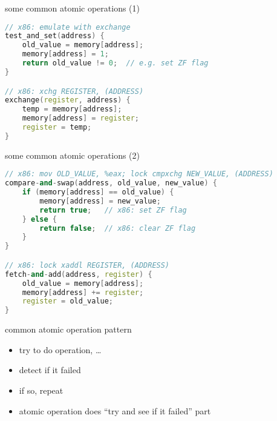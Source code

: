 
\begin{frame}[fragile,label=moreCommonAtomic1]{some common atomic operations (1)}
\begin{lstlisting}[language=C++,style=smaller,deletekeywords=register]
// x86: emulate with exchange
test_and_set(address) {
    old_value = memory[address];
    memory[address] = 1;
    return old_value != 0;  // e.g. set ZF flag
}

// x86: xchg REGISTER, (ADDRESS)
exchange(register, address) {
    temp = memory[address];
    memory[address] = register;
    register = temp;
}
\end{lstlisting}
\end{frame}

\begin{frame}[fragile,label=moreCommonAtomic2]{some common atomic operations (2)}
\begin{lstlisting}[language=C++,style=smaller,deletekeywords=register]
// x86: mov OLD_VALUE, %eax; lock cmpxchg NEW_VALUE, (ADDRESS)
compare-and-swap(address, old_value, new_value) {
    if (memory[address] == old_value) {
        memory[address] = new_value;
        return true;   // x86: set ZF flag
    } else {
        return false;  // x86: clear ZF flag
    }
}

// x86: lock xaddl REGISTER, (ADDRESS)
fetch-and-add(address, register) {
    old_value = memory[address];
    memory[address] += register;
    register = old_value;
}
\end{lstlisting}
\end{frame}

\begin{frame}{common atomic operation pattern}
    \begin{itemize}
    \item try to do operation, \ldots
    \item detect if it failed
    \item if so, repeat
    \vspace{.5cm}
    \item atomic operation does ``try and see if it failed'' part
    \end{itemize}
\end{frame}



